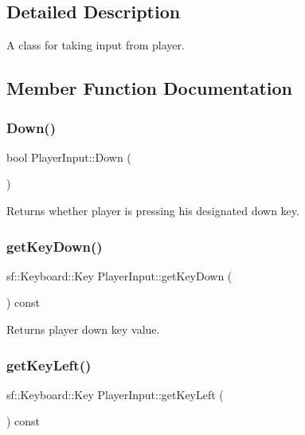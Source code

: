 \subsection{Detailed Description}
A class for taking input from player. 

\subsection{Member Function Documentation}
\hypertarget{classPlayerInput_a0ddb6706f436832085c6e857ce1b6876}{}\label{classPlayerInput_a0ddb6706f436832085c6e857ce1b6876} 
\subsubsection{\texorpdfstring{Down()}{Down()}}
{\footnotesize\ttfamily bool Player\+Input\+::\+Down (\begin{DoxyParamCaption}{ }\end{DoxyParamCaption})}

Returns whether player is pressing his designated down key. \hypertarget{classPlayerInput_a5186c06d0e7f5553787f60ba5673d0cb}{}\label{classPlayerInput_a5186c06d0e7f5553787f60ba5673d0cb} 
\subsubsection{\texorpdfstring{get\+Key\+Down()}{getKeyDown()}}
{\footnotesize\ttfamily sf\+::\+Keyboard\+::\+Key Player\+Input\+::get\+Key\+Down (\begin{DoxyParamCaption}{ }\end{DoxyParamCaption}) const}

Returns player down key value. \hypertarget{classPlayerInput_a010e08e15347be2891655f8687a37dcb}{}\label{classPlayerInput_a010e08e15347be2891655f8687a37dcb} 
\subsubsection{\texorpdfstring{get\+Key\+Left()}{getKeyLeft()}}
{\footnotesize\ttfamily sf\+::\+Keyboard\+::\+Key Player\+Input\+::get\+Key\+Left (\begin{DoxyParamCaption}{ }\end{DoxyParamCaption}) const}

